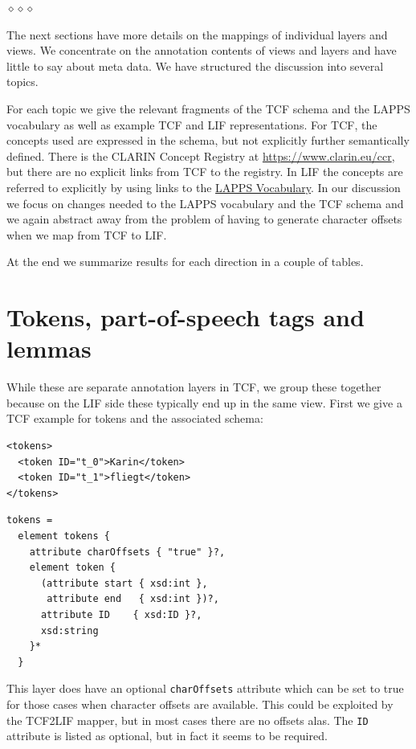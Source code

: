\documentclass[11pt]{article}
\newcommand{\attr}[1]{{\tt #1}}
\newcommand{\sep}{
	\begin{center}
	$\diamond \diamond \diamond$
	\end{center}
}
\newenvironment{example}
    {\begin{tcolorbox}\small}
    {\end{tcolorbox}}
\begin{document}
\sep

The next sections have more details on the mappings of individual layers and views. We concentrate on the annotation contents of views and layers and have little to say about meta data. We have structured the discussion into several topics. 

For each topic we give the relevant fragments of the TCF schema and the LAPPS vocabulary as well as example TCF and LIF representations. For TCF, the concepts used are expressed in the schema, but not explicitly further semantically defined. There is the CLARIN Concept Registry at {\color{blue}\href{https://www.clarin.eu/ccr}{https://www.clarin.eu/ccr}}, but there are no explicit links from TCF to the registry. In LIF the concepts are referred to explicitly by using links to the {\color{blue}\href{http://vocab.lappsgrid.org/}{LAPPS Vocabulary}}. In our discussion we focus on changes needed to the LAPPS vocabulary and the TCF schema and we again abstract away from the problem of having to generate character offsets when we map from TCF to LIF.

At the end we summarize results for each direction in a couple of tables.


\section{Tokens, part-of-speech tags and lemmas}

While these are separate annotation layers in TCF, we group these together because on the LIF side these typically end up in the same view. First we give a TCF example for tokens and the associated schema:

\begin{example}
\begin{verbatim}
<tokens>
  <token ID="t_0">Karin</token>
  <token ID="t_1">fliegt</token>
</tokens>
\end{verbatim}
\end{example}

\begin{example}
\begin{verbatim}
tokens =
  element tokens {
    attribute charOffsets { "true" }?,
    element token {
      (attribute start { xsd:int },
       attribute end   { xsd:int })?,
      attribute ID    { xsd:ID }?,
      xsd:string
    }*
  }
\end{verbatim}
\end{example}

This layer does have an optional \attr{charOffsets} attribute which can be set to true for those cases when character offsets are available. This could be exploited by the TCF2LIF mapper, but in most cases there are no offsets alas. The \attr{ID} attribute is listed as optional, but in fact it seems to be required. 
\end{document}
